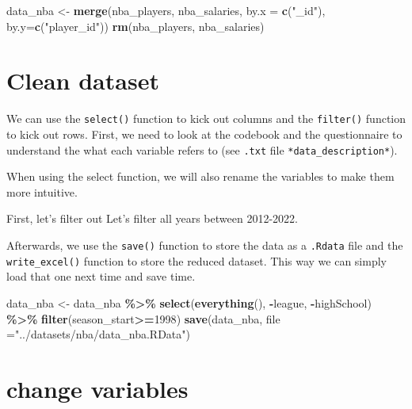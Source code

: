 \documentclass[
]{book}
\newenvironment{Shaded}{\begin{snugshade}}{\end{snugshade}}
\newcommand{\AttributeTok}[1]{\textcolor[rgb]{0.13,0.29,0.53}{#1}}
\newcommand{\DecValTok}[1]{\textcolor[rgb]{0.00,0.00,0.81}{#1}}
\newcommand{\FunctionTok}[1]{\textcolor[rgb]{0.13,0.29,0.53}{\textbf{#1}}}
\newcommand{\NormalTok}[1]{#1}
\newcommand{\OtherTok}[1]{\textcolor[rgb]{0.56,0.35,0.01}{#1}}
\newcommand{\SpecialCharTok}[1]{\textcolor[rgb]{0.81,0.36,0.00}{\textbf{#1}}}
\newcommand{\StringTok}[1]{\textcolor[rgb]{0.31,0.60,0.02}{#1}}
\begin{document}
\begin{Shaded}
\begin{Highlighting}[]
\NormalTok{data\_nba }\OtherTok{\textless{}{-}} \FunctionTok{merge}\NormalTok{(nba\_players, nba\_salaries, }\AttributeTok{by.x =} \FunctionTok{c}\NormalTok{(}\StringTok{"\_id"}\NormalTok{), }\AttributeTok{by.y=}\FunctionTok{c}\NormalTok{(}\StringTok{"player\_id"}\NormalTok{))}
\FunctionTok{rm}\NormalTok{(nba\_players, nba\_salaries)}
\end{Highlighting}
\end{Shaded}

\hypertarget{clean-dataset}{%
\section{Clean dataset}\label{clean-dataset}}

We can use the \texttt{select()} function to kick out columns and the \texttt{filter()} function to kick out rows. First, we need to look at the codebook and the questionnaire to understand the what each variable refers to (see \texttt{.txt} file \texttt{*data\_description*}).

When using the select function, we will also rename the variables to make them more intuitive.

First, let's filter out Let's filter all years between 2012-2022.

Afterwards, we use the \texttt{save()} function to store the data as a \texttt{.Rdata} file and the \texttt{write\_excel()} function to store the reduced dataset. This way we can simply load that one next time and save time.

\begin{Shaded}
\begin{Highlighting}[]
\NormalTok{data\_nba }\OtherTok{\textless{}{-}}\NormalTok{ data\_nba }\SpecialCharTok{\%\textgreater{}\%}
        \FunctionTok{select}\NormalTok{(}\FunctionTok{everything}\NormalTok{(), }\SpecialCharTok{{-}}\NormalTok{league, }\SpecialCharTok{{-}}\NormalTok{highSchool) }\SpecialCharTok{\%\textgreater{}\%}
        \FunctionTok{filter}\NormalTok{(season\_start}\SpecialCharTok{\textgreater{}=}\DecValTok{1998}\NormalTok{)}
\FunctionTok{save}\NormalTok{(data\_nba, }\AttributeTok{file =}\StringTok{"../datasets/nba/data\_nba.RData"}\NormalTok{)}
\end{Highlighting}
\end{Shaded}

\hypertarget{change-variables}{%
\section{change variables}\label{change-variables}}
\end{document}
